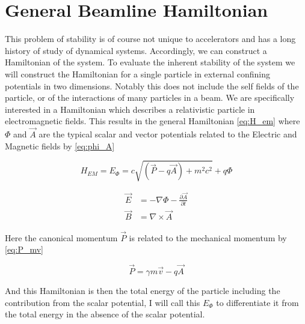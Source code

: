 \section{General Beamline Hamiltonian} \label{sec:genHam}

This problem of stability is of course not unique to accelerators and has a long history of study of dynamical systems. Accordingly, we can construct a Hamiltonian of the system. To evaluate the inherent stability of the system we will construct the Hamiltonian for a single particle in external confining potentials in two dimensions. Notably this does not include the self fields of the particle, or of the interactions of many particles in a beam. We are specifically interested in a Hamiltonian which describes a relativistic particle in electromagnetic fields. This results in the general Hamiltonian \ref{eq:H_em} where $\Phi$ and $\vec{A}$ are the typical scalar and vector potentials related to the Electric and Magnetic fields by \ref{eq:phi_A}

\begin{equation} \label{eq:H_em}
H_{EM} = E_{\Phi} = c\sqrt{(\vec{P} - q\vec{A}) + m^2 c^2} + q\Phi
\end{equation}

\begin{equation} \label{eq:phi_A}
\begin{split} 
\vec{E} &= -\nabla \Phi - \frac{\partial \vec{A}}{\partial t}\\
\vec{B} &= \nabla \times \vec{A}
\end{split}
\end{equation}

Here the canonical momentum $\vec{P}$ is related to the mechanical momentum by \ref{eq:P_mv}

\begin{equation} \label{eq:P_mv}
	\vec{P} = \gamma m\vec{v} - q \vec{A}
\end{equation}

And this Hamiltonian is then the total energy of the particle including the contribution from the scalar potential, I will call this $E_{\Phi}$ to differentiate it from the total energy in the absence of the scalar potential.

